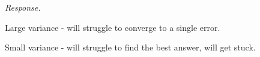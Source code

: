 \textit{Response.}

Large variance - will struggle to converge to a single error.

Small variance - will struggle to find the best answer, will get stuck.

 